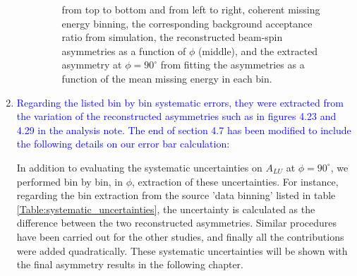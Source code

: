 \begin{enumerate}
\begin{enumerate}
\begin{figure}[tbp]
   \caption{from top to bottom and from left to right, coherent missing energy 
      binning, the corresponding background acceptance ratio from simulation, 
      the reconstructed beam-spin asymmetries as a function of $\phi$ (middle), 
   and the extracted asymmetry at $\phi = 90 ^{\circ}$ from fitting the 
asymmetries as a function of the mean missing energy in each bin.  }
   \label{fig:coherent_ME_bins_2}
    \end{figure}
\end{enumerate}

\item \textcolor{blue}{Regarding the listed bin by bin systematic errors, they 
   were extracted from the variation of the reconstructed asymmetries such as 
in figures 4.23 and 4.29 in the analysis note. The end of section 4.7 has been 
modified to include the following details on our error bar calculation:}

In addition to evaluating the systematic uncertainties on $A_{LU}$ at $\phi = 
90^{\circ}$, we performed bin by bin, in $\phi$, extraction of these 
uncertainties. For instance, regarding the bin extraction from the source 'data 
binning' listed in table \ref{Table:systematic_uncertainties}, the uncertainty 
is calculated as the difference between the two reconstructed asymmetries.  
Similar procedures have been carried out for the other studies, and finally all 
the contributions were added quadratically. These systematic uncertainties will 
be shown with the final asymmetry results in the following chapter.

\end{enumerate}

